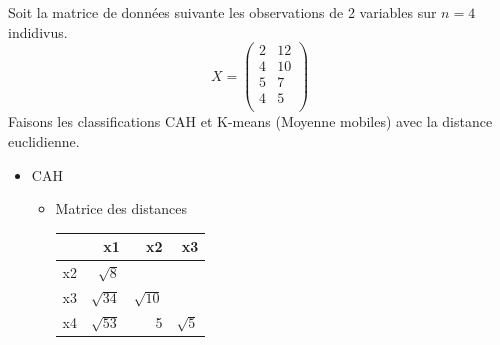 \documentclass[a4paper]{article}
\begin{document}
Soit la matrice  de données suivante les observations de 2 variables sur $n=4$ indidivus.
$$\displaystyle X=\left(\begin{array}{cc}
2 &12\\
4 & 10\\
5 & 7\\
4 & 5\\
\end{array}\right)
$$
Faisons les classifications CAH et K-means (Moyenne mobiles) avec la distance euclidienne.
\begin{itemize}
\item CAH
\begin{itemize}

\item Matrice des distances

 
\begin{tabular}{|l||r|r|r|}
\hline
			&x1 &x2 &x3\\   
\hline
\hline   
x2 & $\sqrt 8$ &  & \\    
x3&  $\sqrt{34}$&  $\sqrt{10}$  &\\
x4 & $\sqrt{53}$&  5&  $\sqrt{5}$\\
\hline
\end{tabular}



\end{itemize}
\end{itemize}
\end{document}
